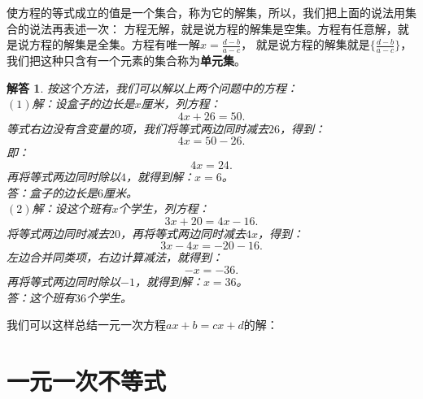 \documentclass[12pt,UTF8]{ctexbook}
\newtheorem*{so}{解答}
\begin{document}
使方程的等式成立的值是一个集合，称为它的解集，所以，我们把上面的说法用集合的说法再表述一次：
方程无解，就是说方程的解集是空集。方程有任意解，就是说方程的解集是全集。方程有唯一解$x = \frac{d-b}{a-c}$，
就是说方程的解集就是$\{\frac{d-b}{a-c}\}$，我们把这种只含有一个元素的集合称为\textbf{单元集}。
\begin{so}
    按这个方法，我们可以解以上两个问题中的方程：\\
    $(1)$解：设盒子的边长是$x$厘米，列方程：
    $$ 4x + 26 = 50.$$
    等式右边没有含变量的项，我们将等式两边同时减去$26$，得到：
    $$ 4x = 50 - 26.$$
    即：
    $$ 4x = 24. $$
    再将等式两边同时除以$4$，就得到解：$x=6$。\\
    答：盒子的边长是$6$厘米。\\
    $(2)$解：设这个班有$x$个学生，列方程：
    $$ 3x + 20 = 4x - 16.$$
    将等式两边同时减去$20$，再将等式两边同时减去$4x$，得到：
    $$ 3x - 4x = -20 - 16.$$
    左边合并同类项，右边计算减法，就得到：
    $$ -x = -36. $$
    再将等式两边同时除以$-1$，就得到解：$x = 36$。\\
    答：这个班有$36$个学生。
\end{so}
我们可以这样总结一元一次方程$ax+b=cx+d$的解：
\begin{center}
\end{center}

\section{一元一次不等式}
\end{document}
